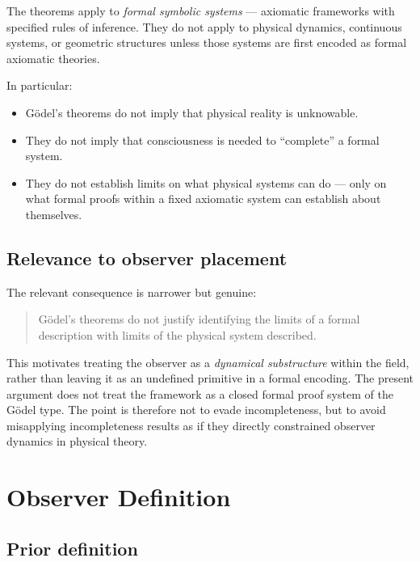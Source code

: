 \documentclass[12pt]{article}
\begin{document}
The theorems apply to \textit{formal symbolic systems} --- axiomatic frameworks with specified rules of inference. They do not apply to physical dynamics, continuous systems, or geometric structures unless those systems are first encoded as formal axiomatic theories.

In particular:
\begin{itemize}
    \item G\"odel's theorems do not imply that physical reality is unknowable.
    \item They do not imply that consciousness is needed to ``complete'' a formal system.
    \item They do not establish limits on what physical systems can do --- only on what formal proofs within a fixed axiomatic system can establish about themselves.
\end{itemize}

\subsection{Relevance to observer placement}

The relevant consequence is narrower but genuine:

\begin{quote}
G\"odel's theorems do not justify identifying the limits of a formal description with limits of the physical system described.
\end{quote}

This motivates treating the observer as a \textit{dynamical substructure} within the field, rather than leaving it as an undefined primitive in a formal encoding. The present argument does not treat the framework as a closed formal proof system of the G\"odel type. The point is therefore not to evade incompleteness, but to avoid misapplying incompleteness results as if they directly constrained observer dynamics in physical theory.

\section{Observer Definition}\label{sec:definition}

\subsection{Prior definition}
\end{document}
